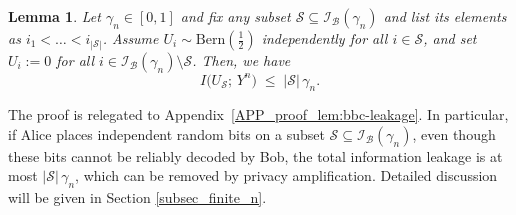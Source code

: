 \documentclass[onecolumn]{IEEEtran} %
\newcommand{\1}{\mathbbm{1}}
\theoremstyle{boldremark}
\newtheorem{lemma}{Lemma}
\begin{document}
\begin{lemma}\label{lem:bbc-leakage}
Let \(\gamma_n\in[0,1]\) and fix any subset \(\mathcal{S}\subseteq\mathcal{I}_{\mathcal B}(\gamma_n)\) and list its elements as
\(i_1<\dots<i_{|\mathcal{S}|}\).
Assume \(U_i\sim\mathrm{Bern}(\tfrac12)\) independently for all \(i\in\mathcal{S}\), and set \(U_i:=0\) for all
\(i\in \mathcal{I}_{\mathcal B}(\gamma_n)\setminus\mathcal{S}\).
Then, we have
\[
  I\bigl(U_{\mathcal{S}};\,Y^n\bigr)  \;\le\;  |\mathcal{S}|\,\gamma_n.
\]
\end{lemma}



The proof is relegated to Appendix~\ref{APP_proof_lem:bbc-leakage}. In particular,
if Alice places independent random bits on a subset
$\mathcal{S}\subseteq\mathcal{I}_{\mathcal B}(\gamma_n)$, even though these bits cannot be
reliably decoded by Bob, the total information leakage  is at most $|\mathcal{S}|\,\gamma_n$, which can be removed
by privacy amplification. Detailed discussion will be given in Section \ref{subsec_finite_n}.
\end{document}
